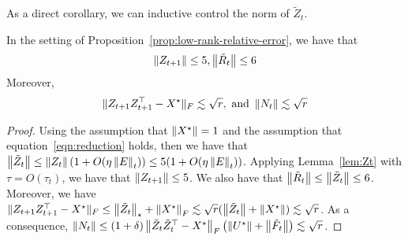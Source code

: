 As a direct corollary, we can inductive control the norm of $\tilde{Z}_t$. 
\begin{cor}\label{cor:stat}
	In the setting of Proposition~\ref{prop:low-rank-relative-error}, we have that 
	\begin{align*}
	\left\|Z_{t+1}\right\|\le 5, \left\|\tilde{R}_t\right\| \leq 6
	\end{align*}
	Moreover, 
	\begin{align*}
	\|Z_{t+1}Z_{t+1}^\top - X^\star\|_F\lesssim \sqrt{r}, \textup{ and } \left\|N_t\right\|\lesssim \sqrt{r}
	\end{align*}
\end{cor}
\begin{proof}
	Using the assumption that $\left\|{X}^\star\right\|=1$ and the assumption that equation~\eqref{eqn:reduction} holds, then we have that $\left\|\tilde{Z}_t\right\| \leq \left\|Z_t\right\|(1 + O(\eta \left\|E\right\|_t)) \leq 5(1 + O(\eta \left\|E\right\|_t))$. Applying Lemma~\ref{lem:Zt} with $\tau = O(\tau_t)$, we have that $\left\|Z_{t+1}\right\|\le 5$. We also have that $\left\|\tilde{R}_t\right\|\le \left\|\tilde{Z}_t\right\|\le 6$. Moreover, we have $\|Z_{t+1}Z_{t+1}^\top - X^\star\|_F \le \left\|\tilde{Z}_t\right\|_{\star} + \left\|X^\star\right\|_F \lesssim \sqrt{r}(\left\|\tilde{Z}_t\right\|+ \left\|X^\star\right\|)\lesssim \sqrt{r}$. As a consequence, $\left\|N_t\right\|\leq (1 + \delta)\left\|\tilde{Z}_t \tilde{Z}_t^{\top} - X^\star\right\|_F\left( \left\|U^\star\right\| + \left\|\tilde{F}_t\right\| \right)\lesssim \sqrt{r}$. 
\end{proof}


